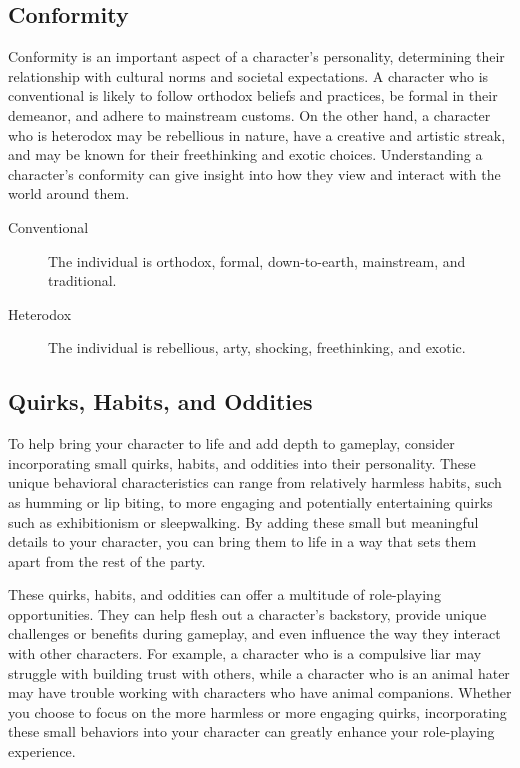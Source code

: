 \subsection{\textbf{Conformity}}

Conformity is an important aspect of a character's personality, determining their relationship with cultural norms and societal expectations. A character who is conventional is likely to follow orthodox beliefs and practices, be formal in their demeanor, and adhere to mainstream customs. On the other hand, a character who is heterodox may be rebellious in nature, have a creative and artistic streak, and may be known for their freethinking and exotic choices. Understanding a character's conformity can give insight into how they view and interact with the world around them.

\begin{description}
    \item[Conventional] The individual is orthodox, formal, down-to-earth, mainstream, and traditional.
    \item[Heterodox] The individual is rebellious, arty, shocking, freethinking, and exotic.
\end{description}

\subsection{\textbf{Quirks, Habits, and Oddities}}

To help bring your character to life and add depth to gameplay, consider incorporating small quirks, habits, and oddities into their personality. These unique behavioral characteristics can range from relatively harmless habits, such as humming or lip biting, to more engaging and potentially entertaining quirks such as exhibitionism or sleepwalking. By adding these small but meaningful details to your character, you can bring them to life in a way that sets them apart from the rest of the party.

These quirks, habits, and oddities can offer a multitude of role-playing opportunities. They can help flesh out a character's backstory, provide unique challenges or benefits during gameplay, and even influence the way they interact with other characters. For example, a character who is a compulsive liar may struggle with building trust with others, while a character who is an animal hater may have trouble working with characters who have animal companions. Whether you choose to focus on the more harmless or more engaging quirks, incorporating these small behaviors into your character can greatly enhance your role-playing experience.

